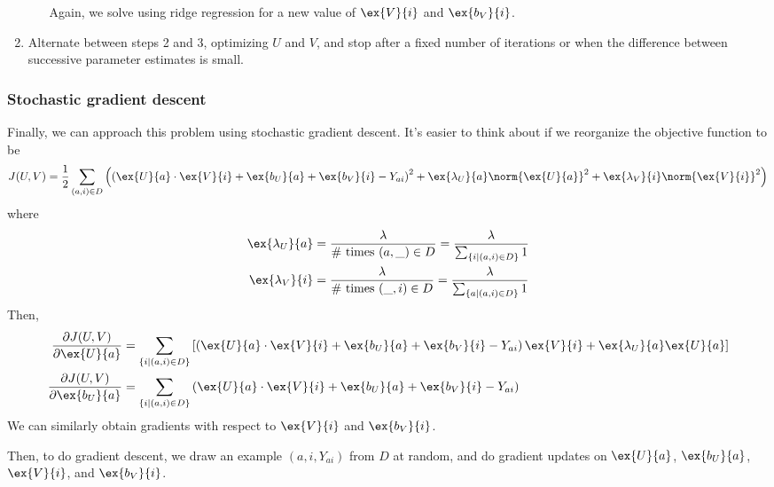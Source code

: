 \begin{enumerate}
\begin{itemize}
                Again, we solve using ridge regression for a new value of
                $\ex{V}{i}$ and $\ex{b_V}{i}$.
        \end{itemize}
  \item Alternate between steps 2 and 3, optimizing $U$ and $V$, and
        stop after a fixed number of iterations or when the difference
        between successive parameter estimates is small.
\end{enumerate}

\subsubsection{Stochastic  gradient descent}
Finally, we can approach this problem using stochastic gradient
descent.  It's easier to think about if we reorganize the objective
function to be
\[
  J(U,V) = \frac{1}{2} \sum_{(a,i)\in D} \left(\left(
  \ex{U}{a} \cdot \ex{V}{i} + \ex{b_U}{a} + \ex{b_V}{i}
  - Y_{ai}\right)^2
  + \ex{\lambda_U}{a} \norm{\ex{U}{a}}^2
  + \ex{\lambda_V}{i}\norm{\ex{V}{i}}^2 \right)
\]
where
\begin{align*}
  \ex{\lambda_U}{a} & = \frac{\lambda}{\# \text{ times }(a, \_) \in D}
  = \frac{\lambda}{\sum_{\{i \mid (a,i) \in D\}} 1}                     \\
  \ex{\lambda_V}{i} & = \frac{\lambda}{\# \text{ times } (\_, i) \in D}
  = \frac{\lambda}{\sum_{\{a \mid (a,i) \in D\}} 1}
\end{align*}
Then,
\begin{align*}
  \frac{\partial J(U,V)}{\partial \ex{U}{a}}
   & = \sum_{\{i \mid (a,i) \in D\}}
  \left[\left(\ex{U}{a} \cdot \ex{V}{i} + \ex{b_U}{a}
    + \ex{b_V}{i} - Y_{ai}\right) \ex{V}{i}
  + \ex{\lambda_U}{a}\ex{U}{a}\right] \\
  \frac{\partial J(U,V)}{\partial \ex{b_U}{a}}
   & = \sum_{\{i \mid (a,i) \in D\}}
  \left( \ex{U}{a} \cdot \ex{V}{i} + \ex{b_U}{a} + \ex{b_V}{i}
  - Y_{ai}\right)
\end{align*}
We can similarly obtain gradients with respect to $\ex{V}{i}$ and
$\ex{b_V}{i}$.

Then, to do gradient descent, we draw an example $(a, i, Y_{ai})$ from
$D$ at random, and do gradient updates on $\ex{U}{a}$, $\ex{b_U}{a}$,
$\ex{V}{i}$, and $\ex{b_V}{i}$.


